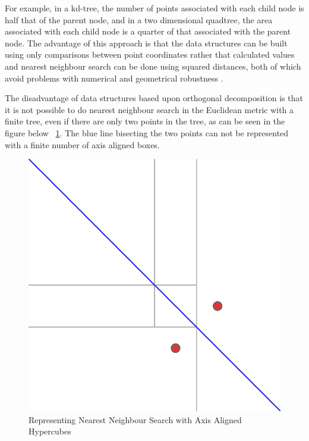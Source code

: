 \documentclass[mcs]{scsthesis}
\begin{document}
For example, in a kd-tree, the number of points associated with each child node
is half that of the parent node, and in a two dimensional quadtree, the area
associated with each child node is a quarter of that associated with the parent
node. The advantage of this approach is that the data structures can be built
using only comparisons between point coordinates rather that calculated values
and nearest neighbour search can be done using squared distances, both of which
avoid problems with numerical and geometrical robustness \cite{shewchuk}.

The disadvantage of data structures based upon orthogonal decomposition is that
it is not possible to do nearest neighbour search in the Euclidean metric with
a finite tree, even if there are only two points in the tree, as can be seen
in the figure below ~\ref{fig:no_finite_tree}. The blue line bisecting the two
points can not be represented with a finite number of axis aligned boxes.

\begin{figure}
\begin{center}
\includegraphics[scale=0.5]{diagrams/no_finite_tree.eps}
\caption{Representing Nearest Neighbour Search with Axis Aligned Hypercubes}
\label{fig:no_finite_tree}
\end{center}
\end{figure}
\end{document}
